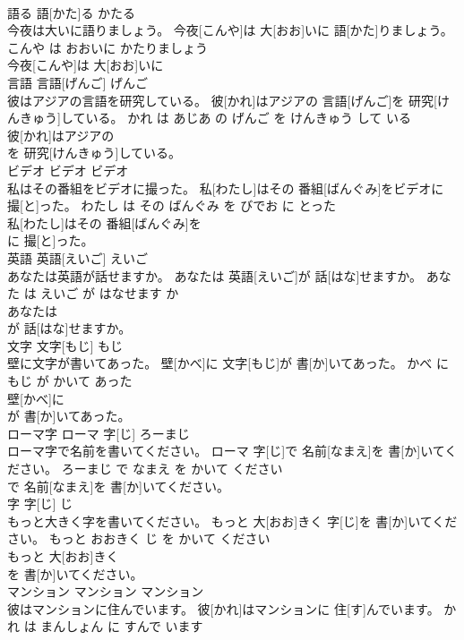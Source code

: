 \documentclass[8pt]{extreport}
\begin{document}
\begin{CJK}{UTF8}{min}
\\	語る	語[かた]る	かたる	
\\	今夜は大いに語りましょう。	今夜[こんや]は 大[おお]いに 語[かた]りましょう。	こんや は おおいに かたりましょう	
\\	今夜[こんや]は 大[おお]いに
\\	言語	言語[げんご]	げんご	
\\	彼はアジアの言語を研究している。	彼[かれ]はアジアの 言語[げんご]を 研究[けんきゅう]している。	かれ は あじあ の げんご を けんきゅう して いる	
\\	彼[かれ]はアジアの
\\	を 研究[けんきゅう]している。		
\\	ビデオ	ビデオ	ビデオ	
\\	私はその番組をビデオに撮った。	私[わたし]はその 番組[ばんぐみ]をビデオに 撮[と]った。	わたし は その ばんぐみ を びでお に とった	
\\	私[わたし]はその 番組[ばんぐみ]を
\\	に 撮[と]った。		
\\	英語	英語[えいご]	えいご	
\\	あなたは英語が話せますか。	あなたは 英語[えいご]が 話[はな]せますか。	あなた は えいご が はなせます か	
\\	あなたは
\\	が 話[はな]せますか。		
\\	文字	文字[もじ]	もじ	
\\	壁に文字が書いてあった。	壁[かべ]に 文字[もじ]が 書[か]いてあった。	かべ に もじ が かいて あった	
\\	壁[かべ]に
\\	が 書[か]いてあった。		
\\	ローマ字	ローマ 字[じ]	ろーまじ	
\\	ローマ字で名前を書いてください。	ローマ 字[じ]で 名前[なまえ]を 書[か]いてください。	ろーまじ で なまえ を かいて ください	
\\	で 名前[なまえ]を 書[か]いてください。		
\\	字	字[じ]	じ	
\\	もっと大きく字を書いてください。	もっと 大[おお]きく 字[じ]を 書[か]いてください。	もっと おおきく じ を かいて ください	
\\	もっと 大[おお]きく
\\	を 書[か]いてください。		
\\	マンション	マンション	マンション	
\\	彼はマンションに住んでいます。	彼[かれ]はマンションに 住[す]んでいます。	かれ は まんしょん に すんで います	

\end{CJK}
\end{document}
